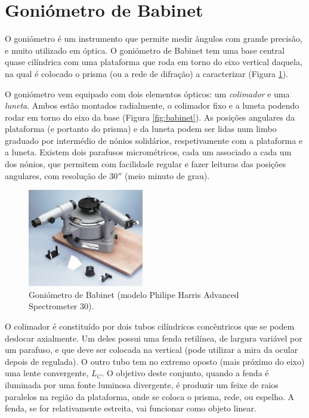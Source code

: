 \documentclass[a4paper,12pt]{article}      %
\begin{document}
\section{\sf Goniómetro de Babinet}
O goniómetro é um instrumento que permite medir ângulos com grande precisão, e muito utilizado em óptica. O goniómetro de Babinet tem uma base central quase cilíndrica com uma plataforma que roda em torno do eixo vertical daquela, na qual é colocado o prisma (ou a rede de difração) a caracterizar (Figura \ref{fig:goniometer}). 

O goniómetro vem equipado com dois elementos ópticos: um \emph{colimador} e uma \emph{luneta}. Ambos estão montados radialmente, o colimador fixo e a luneta podendo rodar em torno do eixo da base (Figura \ref{fig:babinet}). As posições angulares da plataforma (e portanto do prisma) e da luneta podem ser lidas num limbo graduado por intermédio de nónios solidários, respetivamente com a plataforma e a luneta. Existem dois parafusos micrométricos, cada um associado a cada um dos nónios, que permitem com facilidade regular e fazer leituras das posições angulares, com resolução de $30''$ (meio minuto de grau).

\begin{figure}[htb]  
\centering 
	\includegraphics[width=0.45\textwidth]{goniometer}
	\caption{Goniómetro de Babinet (modelo Philipe Harris Advanced Spectrometer 30). \label{fig:goniometer}} 
\end{figure}

O colimador é constituído por dois tubos cilíndricos concêntricos que se podem deslocar axialmente. Um deles possui uma fenda retilínea, de largura variável por um parafuso, e que deve ser colocada na vertical (pode utilizar a mira da ocular depois de regulada). O outro tubo tem no extremo oposto (mais próximo do eixo) uma lente convergente, $L_C$. O objetivo deste conjunto, quando a fenda é iluminada por uma fonte luminosa divergente, é produzir um feixe de raios paralelos na região da plataforma, onde se coloca o prisma, rede, ou espelho. A fenda, se for relativamente estreita, vai funcionar como objeto linear.
\end{document}
